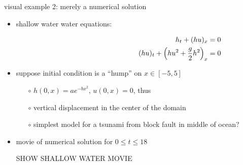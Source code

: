 \documentclass[10pt,hyperref,dvipsnames]{beamer}
\begin{document}
\begin{frame}{visual example 2: merely a numerical solution}

\begin{itemize}
\item shallow water water equations:

\vspace{-11.5mm}
\begin{align*}
\hspace{60mm} h_t + (hu)_x &= 0 \\
(hu)_t + \left(h u^2 + \frac{g}{2} h^2\right)_x &= 0
\end{align*}
\item suppose initial condition is a ``hump'' on $x\in[-5,5]$
    \begin{itemize}
    \item[$\circ$] $h(0,x)=a e^{-bx^2}$, $u(0,x)=0$, thus
    \item[$\circ$] vertical displacement in the center of the domain
    \item[$\circ$] simplest model for a tsunami from block fault in middle of ocean?
    \end{itemize}
\item movie of numerical solution for $0 \le t \le 18$

\vspace{10mm}
\begin{center}
\alert{SHOW SHALLOW WATER MOVIE}
\end{center}

\vspace{10mm}

\end{itemize}
\end{frame}
\end{document}
